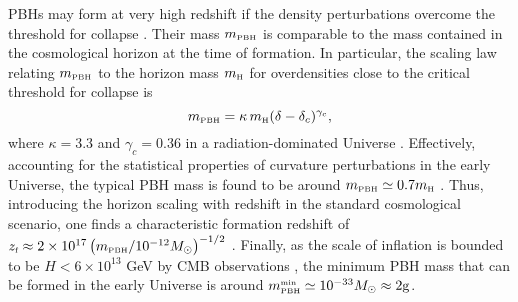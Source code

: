 \documentclass[11pt,a4paper]{article}
\newcommand{\be}{\begin{equation}}
\newcommand{\ee}{\end{equation}}
\newcommand{\lp }{\left (}
\newcommand{\rp }{\right )}
\newcommand{\PBH}{\text{\tiny PBH}}
\begin{document}
PBHs may form at very high redshift \cite{zel1967hypothesis,Hawking:1974rv,Chapline:1975ojl,Carr:1975qj,Ivanov:1994pa,GarciaBellido:1996qt,Ivanov:1997ia,Blinnikov:2016bxu} if the density perturbations overcome the threshold for collapse \cite{Musco:2020jjb,Escriva:2021aeh}. 
Their mass $m_\PBH$ is comparable to the mass contained in the cosmological horizon at the time of formation.
In particular, the scaling law relating $m_\PBH$ to the horizon mass $m_\text{\tiny H}$ for overdensities close to the critical threshold for collapse is \cite{Choptuik:1992jv, Evans:1994pj, Niemeyer:1997mt}
\be
m_\text{\tiny PBH} = \kappa \, m_\text{\tiny H} (\delta - \delta_c)^{\gamma_c},
\ee
where $\kappa = 3.3$ and $\gamma_c = 0.36$ in a radiation-dominated Universe \cite{Musco:2004ak,Musco:2008hv,Musco:2012au,Kalaja:2019uju,Escriva:2019nsa}.
Effectively, accounting for the statistical properties of curvature perturbations in the early Universe, the typical PBH mass is found to be around $m_\PBH \simeq 0.7 m_\text{\tiny H}$ \cite{Germani:2018jgr,Biagetti:2021eep}.
Thus, introducing the horizon scaling with redshift in the standard cosmological scenario, one finds a characteristic formation redshift of $z_\text{\tiny f} \approx  2 \times 10^{17} \lp {m_\PBH}/{10^{-12} M_\odot}\rp ^{-1/2}$ \cite{Sasaki:2018dmp}.
Finally, as the scale of inflation is bounded to be $H<6\times 10^{13}$ GeV by CMB observations \cite{Planck:2018jri}, the minimum PBH mass that can be formed in the early Universe is around $m_\PBH^\text{\tiny min} \simeq 10^{-33} M_\odot \approx 2 {\rm g}$.
 
\end{document}
